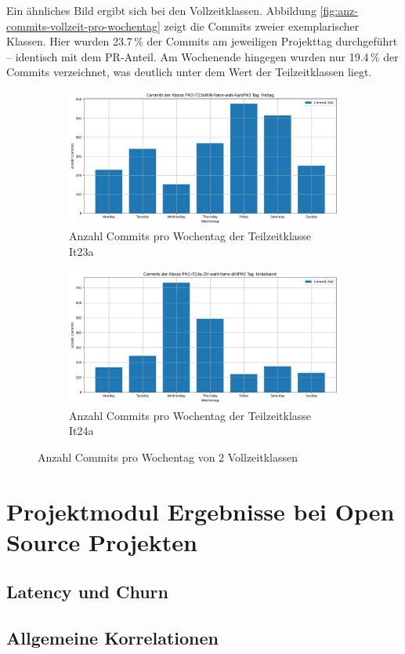 Ein ähnliches Bild ergibt sich bei den Vollzeitklassen. Abbildung \autoref{fig:anz-commits-vollzeit-pro-wochentag} zeigt die Commits zweier exemplarischer Klassen. Hier wurden 23.7\,\% der Commits am jeweiligen Projekttag durchgeführt – identisch mit dem PR-Anteil. Am Wochenende hingegen wurden nur 19.4\,\% der Commits verzeichnet, was deutlich unter dem Wert der Teilzeitklassen liegt.

\begin{figure}[htbp]
    \centering
    \begin{subfigure}[b]{0.48\textwidth}
        \centering
        \includegraphics[width=\textwidth]{Figures/commits-klasse-per-wochentag-23a.png}
         \caption{Anzahl Commits pro Wochentag der Teilzeitklasse It23a}
        \label{fig:anzahl-commits-pro-wochentag-it23a}
    \end{subfigure}
    \hfill
    \begin{subfigure}[b]{0.48\textwidth}
        \centering
        \includegraphics[width=\textwidth]{Figures/commits-klasse-per-wochentag-24a.png}
         \caption{Anzahl Commits pro Wochentag der Teilzeitklasse It24a}
        \label{fig:anzahl-commits-pro-wochentag-it24a}
    \end{subfigure}
    \caption{Anzahl Commits pro Wochentag von 2 Vollzeitklassen}
    \label{fig:anz-commits-vollzeit-pro-wochentag}
\end{figure}

\section{Projektmodul Ergebnisse bei Open Source Projekten}
\subsection{Latency und Churn}
\subsection{Allgemeine Korrelationen}

